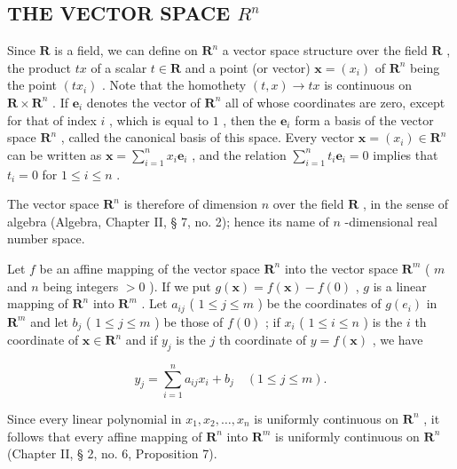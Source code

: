\subsection{\texorpdfstring{THE VECTOR SPACE \(R^{n}\)}{THE VECTOR SPACE R TO THE N}}

Since \(\mathbf{R}\) is a field, we can define on \(\mathbf{R}^n\) a vector space structure over the field \(\mathbf{R}\) , the product \(tx\) of a scalar \(t \in \mathbf{R}\) and a point (or vector) \(\boldsymbol{x} = (x_i)\) of \(\mathbf{R}^n\) being the point \((tx_i)\) . Note that the homothety \((t, x) \to tx\) is continuous on \(\mathbf{R} \times \mathbf{R}^n\) . If \(\boldsymbol{e}_i\) denotes the vector of \(\mathbf{R}^n\) all of whose coordinates are zero, except for that of index \(i\) , which is equal to \(1\) , then the \(\boldsymbol{e}_i\) form a basis of the vector space \(\mathbf{R}^n\) , called the canonical basis of this space. Every vector \(\boldsymbol{x} = (x_i) \in \mathbf{R}^n\) can be written as \(\boldsymbol{x} = \sum_{i=1}^{n} x_i \boldsymbol{e}_i\) , and the relation \(\sum_{i=1}^{n} t_i \boldsymbol{e}_i = 0\) implies that \(t_i = 0\) for \(1 \leqslant i \leqslant n\) .

The vector space \(\mathbf{R}^n\) is therefore of dimension \(n\) over the field \(\mathbf{R}\) , in the sense of algebra (Algebra, Chapter II, § 7, no. 2); hence its name of \(n\) -dimensional real number space.

Let \(f\) be an affine mapping of the vector space \(\mathbf{R}^n\) into the vector space \(\mathbf{R}^m\) ( \(m\) and \(n\) being integers \(>0\) ). If we put \(g(\boldsymbol{x}) = f(\boldsymbol{x}) - f(0)\) , \(g\) is a linear mapping of \(\mathbf{R}^n\) into \(\mathbf{R}^m\) . Let \(a_{ij}\) ( \(1 \leqslant j \leqslant m\) ) be the coordinates of \(g(e_i)\) in \(\mathbf{R}^m\) and let \(b_j\) ( \(1 \leqslant j \leqslant m\) ) be those of \(f(0)\) ; if \(x_i\) ( \(1 \leqslant i \leqslant n\) ) is the \(i\) th coordinate of \(\boldsymbol{x} \in \mathbf{R}^n\) and if \(y_j\) is the \(j\) th coordinate of \(y = f(\boldsymbol{x})\) , we have

\[
y _ {j} = \sum_ {i = 1} ^ {n} a _ {i j} x _ {i} + b _ {j} \quad (1 \leqslant j \leqslant m).
\]

Since every linear polynomial in \(x_1, x_2, \ldots, x_n\) is uniformly continuous on \(\mathbf{R}^n\) , it follows that every affine mapping of \(\mathbf{R}^n\) into \(\mathbf{R}^m\) is uniformly continuous on \(\mathbf{R}^n\) (Chapter II, § 2, no. 6, Proposition 7).


